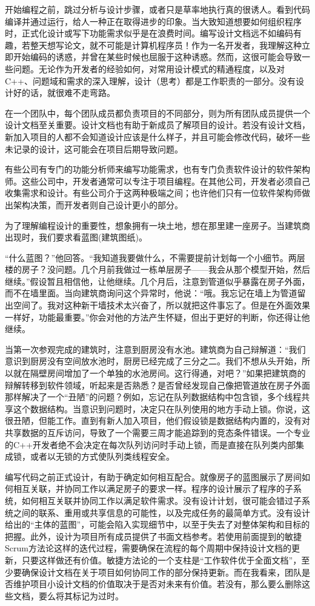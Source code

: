 开始编程之前，跳过分析与设计步骤，或者只是草率地执行真的很诱人。看到代码编译并通过运行，给人一种正在取得进步的印象。当大致知道想要如何组织程序时，正式化设计或写下功能需求似乎是在浪费时间。编写设计文档远不如编码有趣，若整天想写论文，就不可能是计算机程序员！作为一名开发者，我理解这种立即开始编码的诱惑，并曾在某些时候也屈服于这种诱惑。然而，这很可能会导致一些问题。无论作为开发者的经验如何，对常用设计模式的精通程度，以及对C++、问题域和需求的深入理解，设计（思考）都是工作职责的一部分。没有设计好的话，就很难不走弯路。

在一个团队中，每个团队成员都负责项目的不同部分，则为所有团队成员提供一个设计文档至关重要。设计文档也有助于新成员了解项目的设计。若没有设计文档，新加入项目的人都不会知道设计应该是什么样子，并且可能会修改代码，破坏一些未记录的设计，这可能会在项目后期导致问题。

有些公司有专门的功能分析师来编写功能需求，也有专门负责软件设计的软件架构师。这些公司中，开发者通常可以专注于项目编程。在其他公司，开发者必须自己收集需求和设计。有些公司介于这两种极端之间；也许他们只有一位软件架构师做出架构决策，而开发者则自己设计更小的部分。

为了理解编程设计的重要性，想象拥有一块土地，想在那里建一座房子。当建筑商出现时，我们要求看蓝图(建筑图纸)。

“什么蓝图？”他回答。“我知道我要做什么，不需要提前计划每一个小细节。两层楼的房子？没问题。几个月前我做过一栋单层房子——我会从那个模型开始，然后继续。”假设暂且相信他，让他继续。几个月后，注意到管道似乎暴露在房子外面，而不在墙里面。当向建筑商询问这个异常时，他说：“哦。我忘记在墙上为管道留出空间了。我对这种新干墙技术太兴奋了，所以就把这件事忘了。但是在外面效果一样好，功能最重要。”你会对他的方法产生怀疑，但出于更好的判断，你还得让他继续。

当第一次参观完成的建筑时，注意到厨房没有水池。建筑商为自己辩解道：“我们意识到厨房没有空间放水池时，厨房已经完成了三分之二。我们不想从头开始，所以就在隔壁房间增加了一个单独的水池房间。这行得通，对吧？”如果把建筑商的辩解转移到软件领域，听起来是否熟悉？是否曾经发现自己像把管道放在房子外面那样解决了一个“丑陋”的问题？例如，忘记在队列数据结构中包含锁，多个线程共享这个数据结构。当意识到问题时，决定只在队列使用的地方手动上锁。你说，这很丑陋，但能工作。直到有新人加入项目，他们假设锁是数据结构内置的，没有对共享数据的互斥访问，导致了一个需要三周才能追踪到的竞态条件错误。一个专业的C++开发者绝不会决定在每次队列访问时手动上锁，而是直接在队列类内部集成锁，或者以无锁的方式使队列类线程安全。

编写代码之前正式设计，有助于确定如何相互配合。就像房子的蓝图展示了房间如何相互关联，并协同工作以满足房子的要求一样。程序的设计展示了程序的子系统，如何相互关联并协同工作以满足软件需求。没有设计计划，很可能会错过子系统之间的联系、重用或共享信息的可能性，以及完成任务的最简单方式。没有设计给出的“主体的蓝图”，可能会陷入实现细节中，以至于失去了对整体架构和目标的把握。此外，设计为项目所有成员提供了书面文档参考。若使用前面提到的敏捷Scrum方法论这样的迭代过程，需要确保在流程的每个周期中保持设计文档的更新，只要这样做还有价值。敏捷方法论的一个支柱是“工作软件优于全面文档”，至少要确保设计文档在关于项目如何协同工作的部分保持更新。而在我看来，团队是否维护项目小设计文档的价值取决于是否对未来有价值。若没有，那么要么删除这些文档，要么将其标记为过时。

